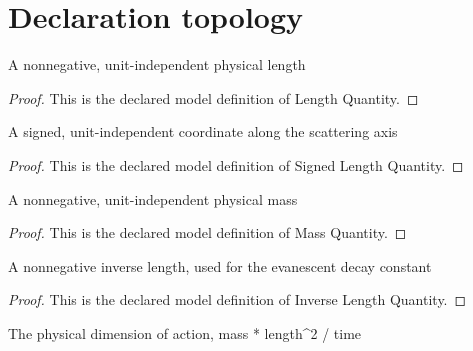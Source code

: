 \section{Declaration topology}
\begin{definition}
  \label{def:physics:phyx-mini-0570:phyxminiproblems-problemphyxmini0570-lengthquantity}
  A nonnegative, unit-independent physical length
\end{definition}
\begin{proof}
  This is the declared model definition of Length Quantity.
\end{proof}
\begin{definition}
  \label{def:physics:phyx-mini-0570:phyxminiproblems-problemphyxmini0570-signedlengthquantity}
  A signed, unit-independent coordinate along the scattering axis
\end{definition}
\begin{proof}
  This is the declared model definition of Signed Length Quantity.
\end{proof}
\begin{definition}
  \label{def:physics:phyx-mini-0570:phyxminiproblems-problemphyxmini0570-massquantity}
  A nonnegative, unit-independent physical mass
\end{definition}
\begin{proof}
  This is the declared model definition of Mass Quantity.
\end{proof}
\begin{definition}
  \label{def:physics:phyx-mini-0570:phyxminiproblems-problemphyxmini0570-inverselengthquantity}
  A nonnegative inverse length, used for the evanescent decay constant
\end{definition}
\begin{proof}
  This is the declared model definition of Inverse Length Quantity.
\end{proof}
\begin{definition}
  \label{def:physics:phyx-mini-0570:phyxminiproblems-problemphyxmini0570-actiondimension}
  The physical dimension of action, mass * length\textasciicircum{}2 / time
\end{definition}
